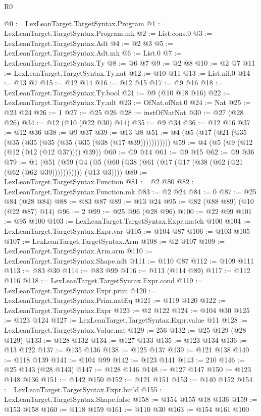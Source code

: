 \begin{lexlean}{R0}
\begin{coremodule}
@0 := LexLeanTarget.TargetSyntax.Program
@1 := LexLeanTarget.TargetSyntax.Program.mk
@2 := List.cons.{0}
@3 := LexLeanTarget.TargetSyntax.Adt
@4 := @2 @3
@5 := LexLeanTarget.TargetSyntax.Adt.mk
@6 := List.{0}
@7 := LexLeanTarget.TargetSyntax.Ty
@8 := @6 @7
@9 := @2 @8
@10 := @2 @7
@11 := LexLeanTarget.TargetSyntax.Ty.nat
@12 := @10 @11
@13 := List.nil.{0}
@14 := @13 @7
@15 := @12 @14
@16 := @12 @15
@17 := @9 @16
@18 := LexLeanTarget.TargetSyntax.Ty.bool
@21 := @9 (@10 @18 @16)
@22 := LexLeanTarget.TargetSyntax.Ty.adt
@23 := OfNat.ofNat.{0}
@24 := Nat
@25 := @23 @24
@26 := 1
@27 := @25 @26
@28 := instOfNatNat
@30 := @27 (@28 @26)
@34 := @12 (@10 (@22 @30) @14)
@35 := @9 @34
@36 := @12 @16
@37 := @12 @36
@38 := @9 @37
@39 := @13 @8
@51 := @4 (@5 (@17 (@21 (@35 (@35 (@35 (@35 (@35 (@35 (@38 (@17 @39)))))))))))
@59 := @4 (@5 (@9 (@12 (@12 (@12 (@12 @37)))) @39))
@60 := @9 @14
@61 := @9 @15
@62 := @9 @36
@79 := @1
    (@51 (@59 (@4 (@5 (@60 (@38 (@61 (@17 (@17 (@38 (@62 (@21 (@62 (@62 @39))))))))))) (@13 @3))))
@80 := LexLeanTarget.TargetSyntax.Function
@81 := @2 @80
@82 := LexLeanTarget.TargetSyntax.Function.mk
@83 := @2 @24
@84 := 0
@87 := @25 @84 (@28 @84)
@88 := @83 @87
@89 := @13 @24
@95 := @82 (@88 @89) (@10 (@22 @87) @14)
@96 := 2
@99 := @25 @96 (@28 @96)
@100 := @22 @99
@101 := @95 @100
@103 := LexLeanTarget.TargetSyntax.Expr.match @100
@104 := LexLeanTarget.TargetSyntax.Expr.var
@105 := @104 @87
@106 := @103 @105
@107 := LexLeanTarget.TargetSyntax.Arm
@108 := @2 @107
@109 := LexLeanTarget.TargetSyntax.Arm.arm
@110 := LexLeanTarget.TargetSyntax.Shape.adt
@111 := @110 @87
@112 := @109 @111
@113 := @83 @30
@114 := @83 @99
@116 := @113 (@114 @89)
@117 := @112 @116
@118 := LexLeanTarget.TargetSyntax.Expr.cond
@119 := LexLeanTarget.TargetSyntax.Expr.prim
@120 := LexLeanTarget.TargetSyntax.Prim.natEq
@121 := @119 @120
@122 := LexLeanTarget.TargetSyntax.Expr
@123 := @2 @122
@124 := @104 @30
@125 := @123 @124
@127 := LexLeanTarget.TargetSyntax.Expr.value @11
@128 := LexLeanTarget.TargetSyntax.Value.nat
@129 := 256
@132 := @25 @129 (@28 @129)
@133 := @128 @132
@134 := @127 @133
@135 := @123 @134
@136 := @13 @122
@137 := @135 @136
@138 := @125 @137
@139 := @121 @138
@140 := @118 @139
@141 := @104 @99
@142 := @123 @141
@143 := 210
@146 := @25 @143 (@28 @143)
@147 := @128 @146
@148 := @127 @147
@150 := @123 @148 @136
@151 := @142 @150
@152 := @121 @151
@153 := @140 @152
@154 := LexLeanTarget.TargetSyntax.Expr.build
@155 := LexLeanTarget.TargetSyntax.Shape.false
@158 := @154 @155 @18 @136
@159 := @153 @158
@160 := @118 @159
@161 := @110 @30
@163 := @154 @161 @100

\end{coremodule}
\end{lexlean}
